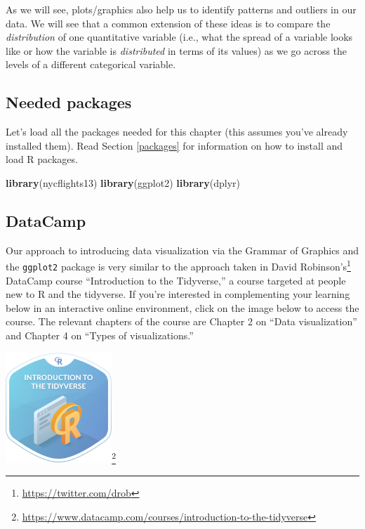 \documentclass[12pt,]{krantz}
\makeatletter
\newenvironment{Shaded}{\begin{snugshade}}{\end{snugshade}}
\newcommand{\KeywordTok}[1]{\textcolor[rgb]{0.27,0.27,0.27}{\textbf{#1}}}
\newcommand{\NormalTok}[1]{#1}
\renewcommand{\href}[2]{#2\footnote{\url{#1}}}
\newenvironment{kframe}{%
\medskip{}
\setlength{\fboxsep}{.8em}
 \def\at@end@of@kframe{}%
 \ifinner\ifhmode%
  \def\at@end@of@kframe{\end{minipage}}%
  \begin{minipage}{\columnwidth}%
 \fi\fi%
 \def\FrameCommand##1{\hskip\@totalleftmargin \hskip-\fboxsep
 \colorbox{shadecolor}{##1}\hskip-\fboxsep
     \hskip-\linewidth \hskip-\@totalleftmargin \hskip\columnwidth}%
 \MakeFramed {\advance\hsize-\width
   \@totalleftmargin\z@ \linewidth\hsize
   \@setminipage}}%
 {\par\unskip\endMakeFramed%
 \at@end@of@kframe}
\renewenvironment{Shaded}{\begin{kframe}}{\end{kframe}}
\makeatother
\begin{document}
As we will see, plots/graphics also help us to identify patterns and
outliers in our data. We will see that a common extension of these ideas
is to compare the \emph{distribution} of one quantitative variable
(i.e., what the spread of a variable looks like or how the variable is
\emph{distributed} in terms of its values) as we go across the levels of
a different categorical variable.

\subsection*{Needed packages}\label{needed-packages}


Let's load all the packages needed for this chapter (this assumes you've
already installed them). Read Section \ref{packages} for information on
how to install and load R packages.

\begin{Shaded}
\begin{Highlighting}[]
\KeywordTok{library}\NormalTok{(nycflights13)}
\KeywordTok{library}\NormalTok{(ggplot2)}
\KeywordTok{library}\NormalTok{(dplyr)}
\end{Highlighting}
\end{Shaded}

\subsection*{DataCamp}\label{datacamp}


Our approach to introducing data visualization via the Grammar of
Graphics and the \texttt{ggplot2} package is very similar to the
approach taken in \href{https://twitter.com/drob}{David Robinson's}
DataCamp course ``Introduction to the Tidyverse,'' a course targeted at
people new to R and the tidyverse. If you're interested in complementing
your learning below in an interactive online environment, click on the
image below to access the course. The relevant chapters of the course
are Chapter 2 on ``Data visualization'' and Chapter 4 on ``Types of
visualizations.''

\begin{center}
\href{https://www.datacamp.com/courses/introduction-to-the-tidyverse}{\includegraphics[width=0.3\textwidth]{images/datacamp_intro_to_tidyverse.png}}
\end{center}
\end{document}
